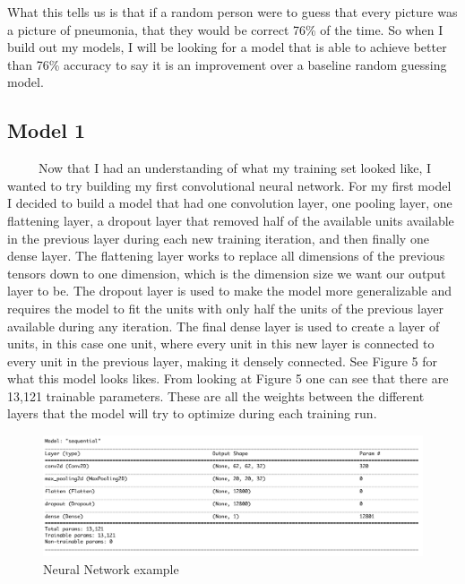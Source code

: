 \documentclass[12pt]{article}
\begin{document}
What this tells us is that if a random person were to guess that every
picture was a picture of pneumonia, that they would be correct 76\% of
the time. So when I build out my models, I will be looking for a model
that is able to achieve better than 76\% accuracy to say it is an
improvement over a baseline random guessing model.

\hypertarget{model-1}{%
\subsection{Model 1}\label{model-1}}

~~~~~Now that I had an understanding of what my training set looked
like, I wanted to try building my first convolutional neural network.
For my first model I decided to build a model that had one convolution
layer, one pooling layer, one flattening layer, a dropout layer that
removed half of the available units available in the previous layer
during each new training iteration, and then finally one dense layer.
The flattening layer works to replace all dimensions of the previous
tensors down to one dimension, which is the dimension size we want our
output layer to be. The dropout layer is used to make the model more
generalizable and requires the model to fit the units with only half the
units of the previous layer available during any iteration. The final
dense layer is used to create a layer of units, in this case one unit,
where every unit in this new layer is connected to every unit in the
previous layer, making it densely connected. See Figure 5 for what this
model looks likes. From looking at Figure 5 one can see that there are
13,121 trainable parameters. These are all the weights between the
different layers that the model will try to optimize during each
training run.

\begin{figure}

{\centering \includegraphics[width=0.75\linewidth,height=0.25\textheight]{images/model1} 

}

\caption{Neural Network example}\label{fig:sample-fig5}
\end{figure}
\end{document}
